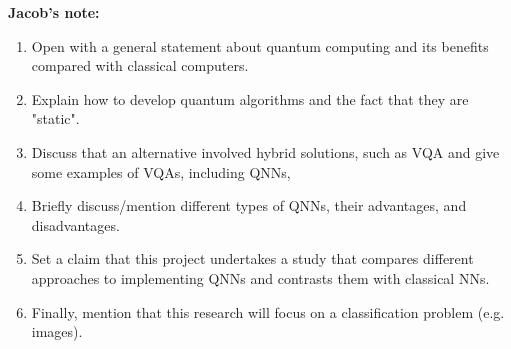 \vspace{60pt}
\textbf {Jacob's note:}
\begin{enumerate}
    \item Open with a general statement about quantum computing and its benefits compared with classical computers.
    \item Explain how to develop quantum algorithms and the fact that they are "static".
    \item Discuss that an alternative involved hybrid solutions, such as VQA and give some examples of VQAs, including QNNs, 
    \item Briefly discuss/mention different types of QNNs, their advantages, and disadvantages.
    \item Set a claim that this project undertakes a study that compares different approaches to implementing QNNs and contrasts them with classical NNs.
    \item Finally, mention that this research will focus on a classification problem (e.g. images).
\end{enumerate}